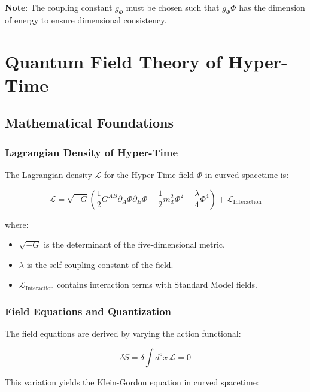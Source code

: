 \documentclass[11pt,a4paper]{article}
\begin{document}
\textbf{Note}: The coupling constant $g_\Phi$ must be chosen such that $g_\Phi \Phi$ has the dimension of energy to ensure dimensional consistency.

\section{Quantum Field Theory of Hyper-Time}

\subsection{Mathematical Foundations}

\subsubsection{Lagrangian Density of Hyper-Time}

The Lagrangian density $\mathcal{L}$ for the Hyper-Time field $\Phi$ in curved spacetime is:

\begin{equation}
\mathcal{L} = \sqrt{-G} \left( \frac{1}{2} G^{AB} \partial_A \Phi \partial_B \Phi - \frac{1}{2} m_\Phi^2 \Phi^2 - \frac{\lambda}{4} \Phi^4 \right) + \mathcal{L}_{\text{Interaction}}
\end{equation}

where:

\begin{itemize}
    \item $\sqrt{-G}$ is the determinant of the five-dimensional metric.
    \item $\lambda$ is the self-coupling constant of the field.
    \item $\mathcal{L}_{\text{Interaction}}$ contains interaction terms with Standard Model fields.
\end{itemize}

\subsubsection{Field Equations and Quantization}

The field equations are derived by varying the action functional:

\begin{equation}
\delta S = \delta \int d^5 x \, \mathcal{L} = 0
\end{equation}

This variation yields the Klein-Gordon equation in curved spacetime:
\end{document}
